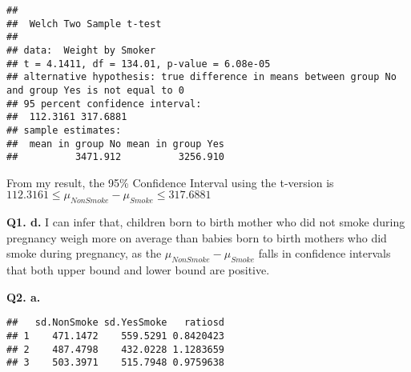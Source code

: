 \documentclass[
]{article}
\newenvironment{Shaded}{\begin{snugshade}}{\end{snugshade}}
\newcommand{\AttributeTok}[1]{\textcolor[rgb]{0.77,0.63,0.00}{#1}}
\newcommand{\ConstantTok}[1]{\textcolor[rgb]{0.00,0.00,0.00}{#1}}
\newcommand{\ControlFlowTok}[1]{\textcolor[rgb]{0.13,0.29,0.53}{\textbf{#1}}}
\newcommand{\DecValTok}[1]{\textcolor[rgb]{0.00,0.00,0.81}{#1}}
\newcommand{\FunctionTok}[1]{\textcolor[rgb]{0.00,0.00,0.00}{#1}}
\newcommand{\NormalTok}[1]{#1}
\newcommand{\OtherTok}[1]{\textcolor[rgb]{0.56,0.35,0.01}{#1}}
\newcommand{\SpecialCharTok}[1]{\textcolor[rgb]{0.00,0.00,0.00}{#1}}
\begin{document}
\begin{verbatim}
## 
##  Welch Two Sample t-test
## 
## data:  Weight by Smoker
## t = 4.1411, df = 134.01, p-value = 6.08e-05
## alternative hypothesis: true difference in means between group No and group Yes is not equal to 0
## 95 percent confidence interval:
##  112.3161 317.6881
## sample estimates:
##  mean in group No mean in group Yes 
##          3471.912          3256.910
\end{verbatim}

From my result, the 95\% Confidence Interval using the t-version is
\(112.3161 \leq \mu_{NonSmoke} - \mu_{Smoke} \leq 317.6881\)

\textbf{Q1. d.} I can infer that, children born to birth mother who did
not smoke during pregnancy weigh more on average than babies born to
birth mothers who did smoke during pregnancy, as the
\(\mu_{NonSmoke} - \mu_{Smoke}\) falls in confidence intervals that both
upper bound and lower bound are positive.

\textbf{Q2. a.}

\begin{Shaded}
\end{Shaded}

\begin{verbatim}
##   sd.NonSmoke sd.YesSmoke   ratiosd
## 1    471.1472    559.5291 0.8420423
## 2    487.4798    432.0228 1.1283659
## 3    503.3971    515.7948 0.9759638
\end{verbatim}
\end{document}
